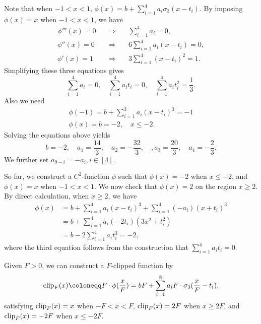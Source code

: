 \documentclass{article}
\newcommand{\clip}{\textnormal{clip}}
\theoremstyle{plain}
\theoremstyle{definition}
\theoremstyle{remark}
\begin{document}
Note that when $-1 < x < 1$, $\phi(x) = b + \sum_{i=1}^4 a_i \sigma_3(x - t_i)$. By imposing $\phi(x) = x$ when $-1 < x < 1$, we have
\begin{equation*}
\begin{aligned}
    \phi'''(x) = 0 \quad  & \Rightarrow \quad  & \sum_{i=1}^4 a_i = 0,\\
    \phi''(x) = 0 \quad & \Rightarrow \quad & 6\sum_{i=1}^4 a_i(x - t_i) = 0, \\
    \phi'(x) = 1 \quad & \Rightarrow \quad & 3\sum_{i=1}^4 (x - t_i)^2 = 1.
\end{aligned}
\end{equation*}
Simplifying these three equations gives 
\begin{equation*}
    \sum_{i=1}^4 a_i = 0, \quad \sum_{i=1}^4 a_i t_i =0, \quad \sum_{i=1}^4 a_i t_i^2 = \frac{1}{3}. 
\end{equation*}
Also we need 
\begin{gather*}
    \phi(-1) = b + \sum_{i=1}^3 a_i(x - t_i)^3 = -1 \\
    \phi(x) = b = -2, \quad x \leq -2. 
\end{gather*}
Solving the equations above yields 
\begin{equation*}
    b = -2, \quad a_1 = \frac{14}{3}, \quad a_2 = -\frac{32}{3}, \quad, a_3 = \frac{20}{3}, \quad a_4 = -\frac{2}{3}. 
\end{equation*}
We further set $a_{9-i} = -a_{i}, i \in [4]$.

So far, we construct a $C^2$-function $\phi$ such that $\phi(x) = -2$ when $x \leq -2$, and $\phi(x) = x$ when $-1 < x < 1$. We now check that $\phi(x) = 2$ on the region $x \geq 2$. By direct calculation, when $x \geq 2$, we have
\begin{align*}
    \phi(x) & = b + \sum_{i=1}^4 a_i (x - t_i)^3 + \sum_{i=1}^4 (-a_i) (x + t_i)^3  \\
    & = b + \sum_{i=1}^4 a_i (-2 t_i) (3x^2 + t_i^2) \\
    & = b - 2\sum_{i=1}^4 a_i t_i^3 = -2, 
\end{align*}
where the third equation follows from the construction that $\sum_{i=1}^4 a_i t_i = 0$. 

Given  $F>0$, we can construct a $F$-clipped function by 
\begin{equation*}
    \clip_F(x) \coloneqq F \cdot \phi (\frac{x}{F}) = bF + \sum_{i=1}^8 a_i F \cdot \sigma_3(\frac{x}{F} - t_i),
\end{equation*}
satisfying $\clip_F(x) = x$ when $-F < x < F$, $\clip_F(x) = 2F$ when $x \geq 2F$, and $\clip_F(x) = -2F$ when $x \leq -2F$. 

\end{document}
